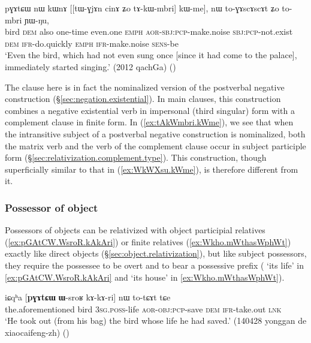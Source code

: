 \begin{exe}
\ex \label{ex:tAkWmbri.kWme}
 \gll  pɣɤtɕɯ nɯ kɯnɤ [[tɯ-ɣjɤn cinɤ ʑo tɤ-kɯ-mbri] kɯ-me], nɯ to-ɣɤscɤscɤt ʑo to-mbri ɲɯ-ŋu, \\
bird \textsc{dem} also one-time even.one \textsc{emph} \textsc{aor}-\textsc{sbj}:\textsc{pcp}-make.noise \textsc{sbj}:\textsc{pcp}-not.exist \textsc{dem} \textsc{ifr}-do.quickly \textsc{emph} \textsc{ifr}-make.noise \textsc{sens}-be \\
\glt `Even the bird, which had not even sung once [since it had come to the palace], immediately started singing.' (2012 qachGa)
()
 \end{exe}

The clause  here is in fact the nominalized version of the postverbal negative construction  (§\ref{sec:negation.existential}). In main clauses, this construction combines a negative existential verb in impersonal (third singular) form with a complement clause in finite form. In (\ref{ex:tAkWmbri.kWme}), we see that when the intransitive subject of a postverbal negative construction is nominalized, both the matrix verb  and the verb of the complement clause  occur in subject participle form (§\ref{sec:relativization.complement.type}). This construction, though superficially similar to that in (\ref{ex:WkWXsu.kWme}), is therefore different from it.


\subsubsection{Possessor of object}  \label{sec:O.possessor.relativization}
Possessors of objects can be relativized with object participial relatives (\ref{ex:pGAtCW.WsroR.kAkAri}) or finite relatives (\ref{ex:Wkho.mWthasWphWt}) exactly like direct objects (§\ref{sec:object.relativization}), but like subject possessors, they require the possessee to be overt and to bear a possessive prefix ( `its life' in \ref{ex:pGAtCW.WsroR.kAkAri} and  `its house' in \ref{ex:Wkho.mWthasWphWt}).

\begin{exe}
\ex \label{ex:pGAtCW.WsroR.kAkAri}
\gll iɕqʰa [\textbf{pɣɤtɕɯ} \textbf{ɯ}-sroʁ kɤ-kɤ-ri] nɯ to-tɕɤt tɕe \\
the.aforementioned bird  \textsc{3sg}.\textsc{poss}-life \textsc{aor}-\textsc{obj}:\textsc{pcp}-save \textsc{dem} \textsc{ifr}-take.out \textsc{lnk} \\
\glt `He took out (from his bag) the bird whose life he had saved.' (140428 yonggan de xiaocaifeng-zh)
()
\end{exe}

